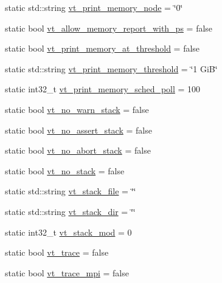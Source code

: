 \begin{DoxyCompactItemize}
static std\+::string \hyperlink{structvt_1_1arguments_1_1_arg_config_af483ff7b7b48be408f82e0117f358fe1}{vt\+\_\+print\+\_\+memory\+\_\+node} = \char`\"{}0\char`\"{}
\item 
static bool \hyperlink{structvt_1_1arguments_1_1_arg_config_a867cfaedc10180e4c78ad7f92e998852}{vt\+\_\+allow\+\_\+memory\+\_\+report\+\_\+with\+\_\+ps} = false
\item 
static bool \hyperlink{structvt_1_1arguments_1_1_arg_config_ad13691458b1fc8a878287818fe6dab26}{vt\+\_\+print\+\_\+memory\+\_\+at\+\_\+threshold} = false
\item 
static std\+::string \hyperlink{structvt_1_1arguments_1_1_arg_config_a8b1a68c9de8b982260814f4dfa2c4c86}{vt\+\_\+print\+\_\+memory\+\_\+threshold} = \char`\"{}1 GiB\char`\"{}
\item 
static int32\+\_\+t \hyperlink{structvt_1_1arguments_1_1_arg_config_af3d5010644a6a721f234323a0b56a83e}{vt\+\_\+print\+\_\+memory\+\_\+sched\+\_\+poll} = 100
\item 
static bool \hyperlink{structvt_1_1arguments_1_1_arg_config_a16f70ff1b626b624e04d21e87a5b08ee}{vt\+\_\+no\+\_\+warn\+\_\+stack} = false
\item 
static bool \hyperlink{structvt_1_1arguments_1_1_arg_config_a21cfd06769807c11dad7729874c11dc4}{vt\+\_\+no\+\_\+assert\+\_\+stack} = false
\item 
static bool \hyperlink{structvt_1_1arguments_1_1_arg_config_a97f4bbea1134d1760b9a9858f7218852}{vt\+\_\+no\+\_\+abort\+\_\+stack} = false
\item 
static bool \hyperlink{structvt_1_1arguments_1_1_arg_config_a4aeb67323853bbd3d2d6092931895f0f}{vt\+\_\+no\+\_\+stack} = false
\item 
static std\+::string \hyperlink{structvt_1_1arguments_1_1_arg_config_a2fadbf7acefac8e3c5b4859f69956df4}{vt\+\_\+stack\+\_\+file} = \char`\"{}\char`\"{}
\item 
static std\+::string \hyperlink{structvt_1_1arguments_1_1_arg_config_a98165ce3647429d761c15c4b7e02226b}{vt\+\_\+stack\+\_\+dir} = \char`\"{}\char`\"{}
\item 
static int32\+\_\+t \hyperlink{structvt_1_1arguments_1_1_arg_config_a5f21f67c8c70d8c0f87f71c62ad3d206}{vt\+\_\+stack\+\_\+mod} = 0
\item 
static bool \hyperlink{structvt_1_1arguments_1_1_arg_config_a61bc1a82c8b643dc430d07f4da316f50}{vt\+\_\+trace} = false
\item 
static bool \hyperlink{structvt_1_1arguments_1_1_arg_config_a50f49d87bb92a729b22102b4da66030a}{vt\+\_\+trace\+\_\+mpi} = false

\end{DoxyCompactItemize}
